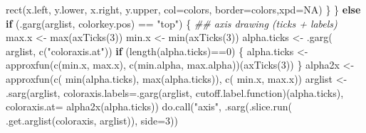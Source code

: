 \documentclass[
  letterpaper,
  DIV=11,
  numbers=noendperiod]{scrartcl}
\newenvironment{Shaded}{\begin{snugshade}}{\end{snugshade}}
\newcommand{\AttributeTok}[1]{\textcolor[rgb]{0.40,0.45,0.13}{#1}}
\newcommand{\ConstantTok}[1]{\textcolor[rgb]{0.56,0.35,0.01}{#1}}
\newcommand{\ControlFlowTok}[1]{\textcolor[rgb]{0.00,0.23,0.31}{\textbf{#1}}}
\newcommand{\DecValTok}[1]{\textcolor[rgb]{0.68,0.00,0.00}{#1}}
\newcommand{\DocumentationTok}[1]{\textcolor[rgb]{0.37,0.37,0.37}{\textit{#1}}}
\newcommand{\FunctionTok}[1]{\textcolor[rgb]{0.28,0.35,0.67}{#1}}
\newcommand{\NormalTok}[1]{\textcolor[rgb]{0.00,0.23,0.31}{#1}}
\newcommand{\OtherTok}[1]{\textcolor[rgb]{0.00,0.23,0.31}{#1}}
\newcommand{\SpecialCharTok}[1]{\textcolor[rgb]{0.37,0.37,0.37}{#1}}
\newcommand{\StringTok}[1]{\textcolor[rgb]{0.13,0.47,0.30}{#1}}
\begin{document}
\begin{Shaded}
\begin{Highlighting}[]
                \FunctionTok{rect}\NormalTok{(x.left, y.lower, x.right, y.upper,}
                     \AttributeTok{col=}\NormalTok{colors, }\AttributeTok{border=}\NormalTok{colors,}\AttributeTok{xpd=}\ConstantTok{NA}\NormalTok{)}
\NormalTok{            \}}
\NormalTok{        \} }\ControlFlowTok{else} \ControlFlowTok{if}\NormalTok{ (}\FunctionTok{.garg}\NormalTok{(arglist, }\StringTok{\textquotesingle{}colorkey.pos\textquotesingle{}}\NormalTok{) }\SpecialCharTok{==} \StringTok{"top"}\NormalTok{) \{}
            \DocumentationTok{\#\# axis drawing (ticks + labels)}
\NormalTok{            max.x }\OtherTok{\textless{}{-}} \FunctionTok{max}\NormalTok{(}\FunctionTok{axTicks}\NormalTok{(}\DecValTok{3}\NormalTok{))}
\NormalTok{            min.x }\OtherTok{\textless{}{-}} \FunctionTok{min}\NormalTok{(}\FunctionTok{axTicks}\NormalTok{(}\DecValTok{3}\NormalTok{))}
\NormalTok{            alpha.ticks }\OtherTok{\textless{}{-}} \FunctionTok{.garg}\NormalTok{( arglist, }\FunctionTok{c}\NormalTok{(}\StringTok{"coloraxis.at"}\NormalTok{))}
            \ControlFlowTok{if}\NormalTok{ (}\FunctionTok{length}\NormalTok{(alpha.ticks)}\SpecialCharTok{==}\DecValTok{0}\NormalTok{) \{}
\NormalTok{                alpha.ticks }\OtherTok{\textless{}{-}} \FunctionTok{approxfun}\NormalTok{(}\FunctionTok{c}\NormalTok{(min.x, max.x),}
                                         \FunctionTok{c}\NormalTok{(min.alpha, max.alpha))(}\FunctionTok{axTicks}\NormalTok{(}\DecValTok{3}\NormalTok{))}
\NormalTok{            \}}
\NormalTok{            alpha2x }\OtherTok{\textless{}{-}} \FunctionTok{approxfun}\NormalTok{(}\FunctionTok{c}\NormalTok{( }\FunctionTok{min}\NormalTok{(alpha.ticks), }\FunctionTok{max}\NormalTok{(alpha.ticks)),}
                                 \FunctionTok{c}\NormalTok{( min.x, max.x))}
\NormalTok{            arglist }\OtherTok{\textless{}{-}} \FunctionTok{.sarg}\NormalTok{(arglist,}
                             \AttributeTok{coloraxis.labels=}\FunctionTok{.garg}\NormalTok{(arglist,}
                               \StringTok{\textquotesingle{}cutoff.label.function\textquotesingle{}}\NormalTok{)(alpha.ticks),}
                             \AttributeTok{coloraxis.at=} \FunctionTok{alpha2x}\NormalTok{(alpha.ticks)) }
            \FunctionTok{do.call}\NormalTok{(}\StringTok{"axis"}\NormalTok{,}
                    \FunctionTok{.sarg}\NormalTok{(}\FunctionTok{.slice.run}\NormalTok{( }\FunctionTok{.get.arglist}\NormalTok{(}\StringTok{\textquotesingle{}coloraxis\textquotesingle{}}\NormalTok{, arglist)),}
                          \AttributeTok{side=}\DecValTok{3}\NormalTok{))}


\end{Highlighting}
\end{Shaded}
\end{document}

